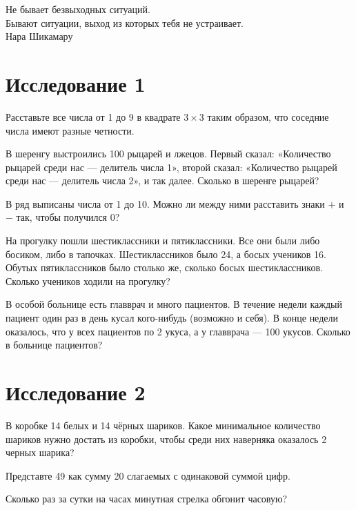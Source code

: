 \begin{flushright}
        \scriptsize{Не бывает безвыходных ситуаций. \\ Бывают ситуации, выход из которых тебя не устраивает. \\
        Нара Шикамару}
\end{flushright}


\section{Исследование 1}

 Расставьте все числа от 1 до 9 в квадрате $3 \times 3$ таким образом, что  соседние числа имеют разные четности.

В шеренгу выстроились 100 рыцарей и лжецов. Первый сказал: «Количество рыцарей среди нас — делитель числа 1», второй сказал: «Количество рыцарей среди нас — делитель числа 2», и так далее. Сколько в шеренге рыцарей?

В ряд выписаны числа от 1 до 10. Можно ли между ними расставить знаки $ + $ и $ - $ так, чтобы получился 0?


На прогулку пошли шестиклассники и пятиклассники. Все они были либо босиком, либо в тапочках. Шестиклассников было 24, а босых учеников 16. Обутых пятиклассников было столько же, сколько босых шестиклассников. Сколько учеников ходили на прогулку?


В особой больнице есть главврач и много пациентов. В течение недели каждый пациент один раз в день кусал кого-нибудь (возможно и себя). В конце недели оказалось, что у всех пациентов по 2 укуса, а у главврача — 100 укусов. Сколько в больнице пациентов?

\newpage

\section{Исследование 2}

 В коробке 14 белых и 14 чёрных шариков. Какое минимальное количество шариков нужно достать из коробки, чтобы среди них наверняка оказалось 2 черных шарика?


 Представте 49 как сумму 20 слагаемых с одинаковой суммой цифр.

Сколько раз за сутки на часах минутная стрелка обгонит часовую?


